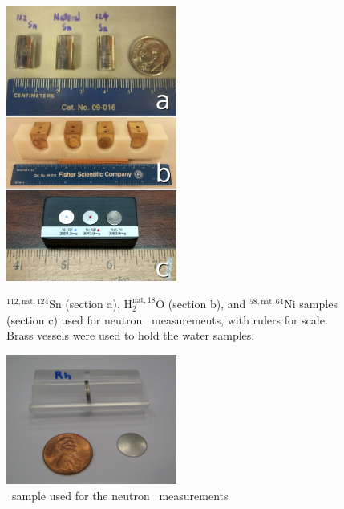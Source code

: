 \begin{figure}[ht]
    \centering
    \includegraphics[width=0.5\textwidth]{figures/AllIsotopicSamples.jpg}
    \caption[${^{112,\text{nat},124}}$Sn, $^{{\text{nat}, 18}}$O, and ${^{58,\text{nat},64}}$Ni
samples used for neutron \tot\ measurements]
{
    ${^{112,\text{nat},124}}$Sn (section a), H$_2^{{\text{nat}, 18}}$O (section
    b), and ${^{58,\text{nat},64}}$Ni
    samples (section c) used for neutron \tot\ measurements, with rulers for
    scale. Brass vessels were used to hold the water samples.
}
    \label{SamplesImage}

    \vspace*{\floatsep}

    \includegraphics[width=0.5\textwidth]{figures/RhodiumSample.jpg}
    \caption{\rhThree\ sample used for the neutron \tot\ measurements}
    \label{RhodiumSample}
\end{figure}

